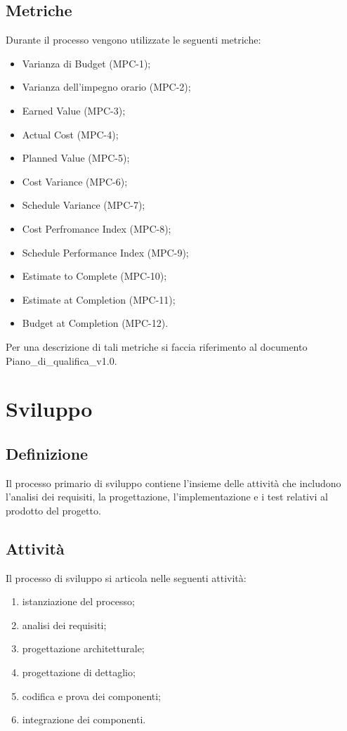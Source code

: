 \subsection{Metriche}
Durante il processo vengono utilizzate le seguenti metriche:
\begin{itemize}
    \item Varianza di Budget (MPC-1);
    \item Varianza dell'impegno orario (MPC-2);
    \item Earned Value (MPC-3);
    \item Actual Cost (MPC-4);
    \item Planned Value (MPC-5);
    \item Cost Variance (MPC-6);
    \item Schedule Variance (MPC-7);
    \item Cost Perfromance Index (MPC-8);
    \item Schedule Performance Index (MPC-9);
    \item Estimate to Complete (MPC-10);
    \item Estimate at Completion (MPC-11);
    \item Budget at Completion (MPC-12).
\end{itemize}
Per una descrizione di tali metriche si faccia riferimento al documento Piano\_di\_qualifica\_v1.0.

\newpage

\section{Sviluppo} \label{sec:sviluppo}
\subsection{Definizione}
Il processo primario di sviluppo contiene l'insieme delle attività che includono l'analisi dei requisiti, la progettazione, l'implementazione e i test relativi al prodotto del progetto.

\subsection{Attività}
Il processo di sviluppo si articola nelle seguenti attività:
\begin{enumerate}
    \item istanziazione del processo;
    \item analisi dei requisiti;
    \item progettazione architetturale;
    \item progettazione di dettaglio;
    \item codifica e prova dei componenti;
    \item integrazione dei componenti.
\end{enumerate}
